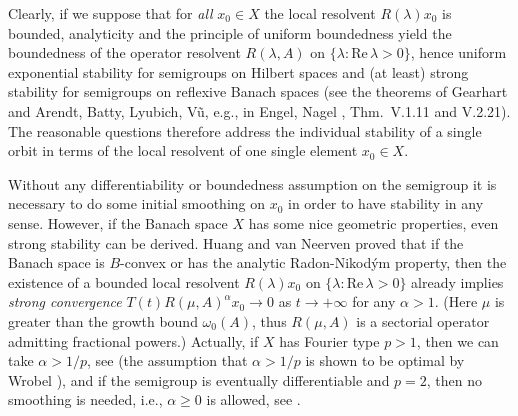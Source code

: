 \documentclass[11pt,intlimits, draft,oneside]{amsart}
\theoremstyle{definition}
\renewcommand{\Re}{\mathrm{Re}\,}
\def\lm{\rightarrow}
\begin{document}
Clearly, if we suppose that for \emph{all} $x_0\in X$ the local
resolvent $R(\lambda)x_0$ is bounded,  analyticity and the principle
of uniform boundedness yield the boundedness of the operator
resolvent $R(\lambda, A)$ on $\{\lambda:\Re \lambda
>0\}$, hence uniform exponential
stability for semigroups on Hilbert spaces and (at least) strong
stability for semigroups on reflexive Banach spaces (see the
theorems of Gearhart and Arendt, Batty, Lyubich, V\~u, e.g., in
Engel, Nagel \cite{engel/nagel:2000}, Thm.~V.1.11 and V.2.21). The
reasonable questions therefore address the individual stability of a
single orbit in terms of the local resolvent of one single element
$x_0\in X $.


Without any differentiability or boundedness assumption on the
semigroup it is necessary to do some initial smoothing on $x_0$ in
order to have stability in any sense.
 However, if the Banach space $X$
has some nice geometric properties, even
strong stability can be derived. Huang and van Neerven
\cite{huang/vanneerven:1999} proved that if the Banach space is
$B$-convex or has the analytic Radon-Nikod\'ym property, then the
existence of a bounded local resolvent $R(\lambda)x_0$ on
$\{\lambda:\Re \lambda
>0\}$ already implies  \emph{strong convergence} $T(t)R(\mu,A)^\alpha
x_0\lm 0$ as $t\lm+\infty$ for any $\alpha>1$. (Here $\mu$ is
greater  than the growth bound $\omega_0(A)$, thus $R(\mu,A)$ is a
sectorial operator admitting fractional powers.) Actually, if $X$
has Fourier type $p>1$, then we can take $\alpha>1/p$, see
\cite{huang/vanneerven:1999} (the assumption that $\alpha>1/p$ is
shown to be optimal by Wrobel \cite{wrobel:1999}), and if the
semigroup is eventually differentiable and $p=2$, then no smoothing
is needed, i.e., $\alpha\geq 0$ is allowed, see \cite{huang:1999}.
\end{document}
